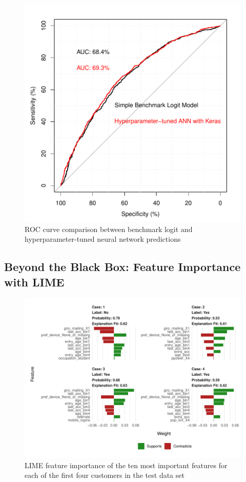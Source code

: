 \documentclass[12pt,a4paper]{article}
\begin{document}
\begin{figure}[ht]
	\centering
  \includegraphics[scale=0.63]{figures/roc_auc_comp.pdf}
	\caption{ROC curve comparison between benchmark logit and hyperparameter-tuned neural network predictions}
	\label{fig_roc}
\end{figure}





\subsection{Beyond the Black Box: Feature Importance with LIME}

\begin{figure}[ht]
	\centering
  \includegraphics[scale=0.83]{figures/lime_first_four.pdf}
	\caption{LIME feature importance of the ten most important features for each of the first four customers in the test data set}
	\label{fig_lime_four}
\end{figure}
\end{document}
